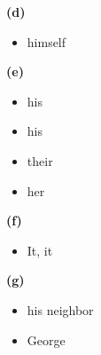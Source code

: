 \documentclass[11pt]{article}
\renewcommand\part[1]{\vspace{.10in}\textbf{(#1)}}
\begin{document}
\part{d}
\begin{itemize}
  \item himself 	
\end{itemize}

\part{e}
\begin{itemize}
  \item his
  \item his
  \item their
  \item her 	
\end{itemize}

\part{f}
\begin{itemize}
  \item It, it 	
\end{itemize}

\part{g}
\begin{itemize}
  \item his neighbor
  \item George 	
\end{itemize}
\end{document}
